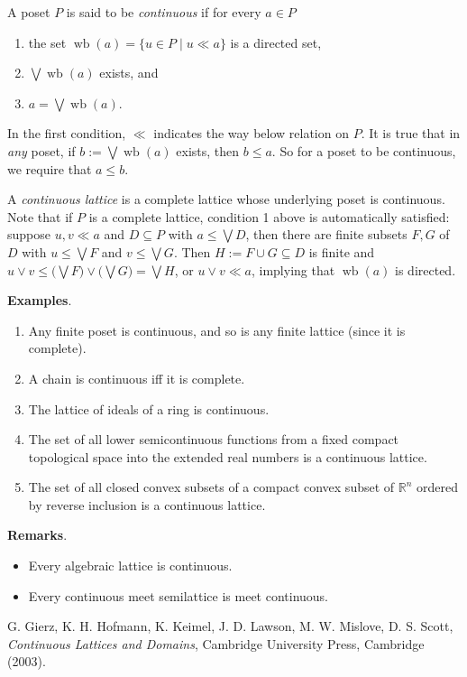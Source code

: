 \documentclass[12pt]{article}
\begin{document}

A poset $P$ is said to be \emph{continuous} if for every $a\in P$
\begin{enumerate}
\item the set $\operatorname{wb}(a)=\lbrace u\in P\mid u\ll a\rbrace$ is a directed set, 
\item $\bigvee \operatorname{wb}(a)$ exists, and
\item $a=\bigvee \operatorname{wb}(a)$.
\end{enumerate}
In the first condition, $\ll$ indicates the way below relation on $P$.  It is true that in \emph{any} poset, if $b:=\bigvee \operatorname{wb}(a)$ exists, then $b\le a$.  So for a poset to be continuous, we require that $a\le b$.

A \emph{continuous lattice} is a complete lattice whose underlying poset is continuous.  Note that if $P$ is a complete lattice, condition 1 above is automatically satisfied: suppose $u,v\ll a$ and $D\subseteq P$ with $a\le \bigvee D$, then there are finite subsets $F,G$ of $D$ with $u\le \bigvee F$ and $v\le \bigvee G$.  Then $H:=F\cup G\subseteq D$ is finite and $u\vee v\le \big(\bigvee F\big)\vee \big(\bigvee G\big)=\bigvee H$, or $u\vee v\ll a$, implying that $\operatorname{wb}(a)$ is directed.

\textbf{Examples}.
\begin{enumerate}
\item Any finite poset is continuous, and so is any finite lattice (since it is complete).  
\item A chain is continuous iff it is complete.  
\item The lattice of ideals of a ring is continuous.  
\item The set of all lower semicontinuous functions from a fixed compact topological space into the extended real numbers is a continuous lattice.
\item The set of all closed convex subsets of a compact convex subset of $\mathbb{R}^n$ ordered by reverse inclusion is a continuous lattice.
\end{enumerate}

\textbf{Remarks}.  
\begin{itemize}
\item
Every algebraic lattice is continuous.  
\item
Every continuous meet semilattice is meet continuous.
\end{itemize}

\begin{thebibliography}{8}
 G. Gierz, K. H. Hofmann, K. Keimel, J. D. Lawson, M. W. Mislove, D. S. Scott, {\em Continuous Lattices and Domains}, Cambridge University Press, Cambridge (2003).
\end{thebibliography}
\end{document}
